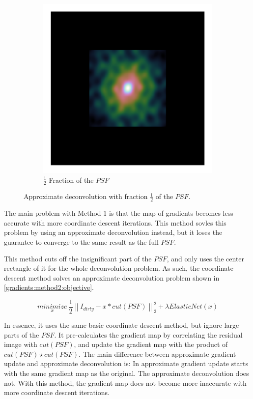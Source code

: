 \begin{figure}[h]
\begin{subfigure}[b]{0.3\linewidth}
		\includegraphics[width=\linewidth,clip, trim= 0.25in 0.25in 0.25in 0.25in]{./chapters/03.cd/simulated/psfCut.png}
		\caption{$\frac{1}{2}$ Fraction of the $PSF$}
	\end{subfigure}
	
	\caption{Approximate deconvolution with fraction $\frac{1}{2}$ of the $PSF$.}
\end{figure} 
The main problem with Method 1 is that the map of gradients becomes less accurate with more coordinate descent iterations. This method sovles this problem by using an approximate deconvolution instead, but it loses the guarantee to converge to the same result as the full $PSF$.

This method cuts off the insignificant part of the $PSF$, and only uses the center rectangle of it for the whole deconvolution problem. As such, the coordinate descent method solves an approximate deconvolution problem shown in \eqref{gradients:method2:objective}.

\begin{equation}\label{gradients:method2:objective}
\underset{x}{minimize} \: \frac{1}{2} \left \| I_{dirty} - x * cut(PSF) \right \|_2^2 + \lambda ElasticNet(x)
\end{equation}

In essence, it uses the same basic coordinate descent method, but ignore large parts of the $PSF$. It pre-calculates the gradient map by correlating the residual image with $cut(PSF)$, and update the gradient map with the product of $cut(PSF) \star cut(PSF)$. The main difference between approximate gradient update and approximate deconvolution is: In approximate gradient update starts with the same gradient map as the original. The approximate deconvolution does not. With this method, the gradient map does not become more inaccurate with more coordinate descent iterations.

